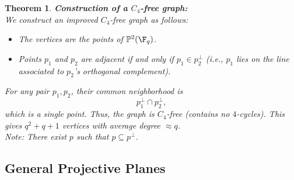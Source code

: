 \documentclass[a4paper]{article}
\newtheorem{thm}{Theorem}[section]
\begin{document}
\begin{thm}
    \textbf{Construction of a $C_4$-free graph:}\\
    We construct an improved $C_4$-free graph as follows:
    \begin{itemize}
        \item The vertices are the points of $\mathbb{P}^2(\F_q)$.
        \item Points $p_1$ and $p_2$ are adjacent if and only if $p_1 \in p_2^\perp$ (i.e., $p_1$ lies on the line associated to $p_2$'s orthogonal complement).
    \end{itemize}
    For any pair $p_1, p_2$, their common neighborhood is
    \[
        p_1^\perp \cap p_2^\perp,
    \]
    which is a single point. Thus, the graph is $C_4$-free (contains no $4$-cycles). This gives $q^2+q+1$ vertices with average degree $\approx q$.\\
    Note: There exist $p$ such that $p\subseteq p^\perp$.
\end{thm}

\subsection{General Projective Planes}
\end{document}
